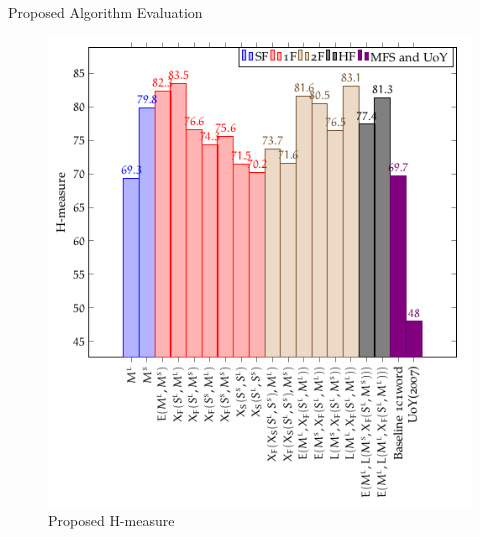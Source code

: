 \documentclass[10pt,xcolor=table]{beamer}
\begin{document}
\begin{frame}{Proposed Algorithm Evaluation}
\begin{figure}
	\centering
	\includegraphics[width=.5\linewidth]{image2/Chapitre4/wsd_PA_Hm.png}
	\caption{Proposed H-measure}
\end{figure}
\end{frame}





%
%
%
%





%
%
\end{document}
